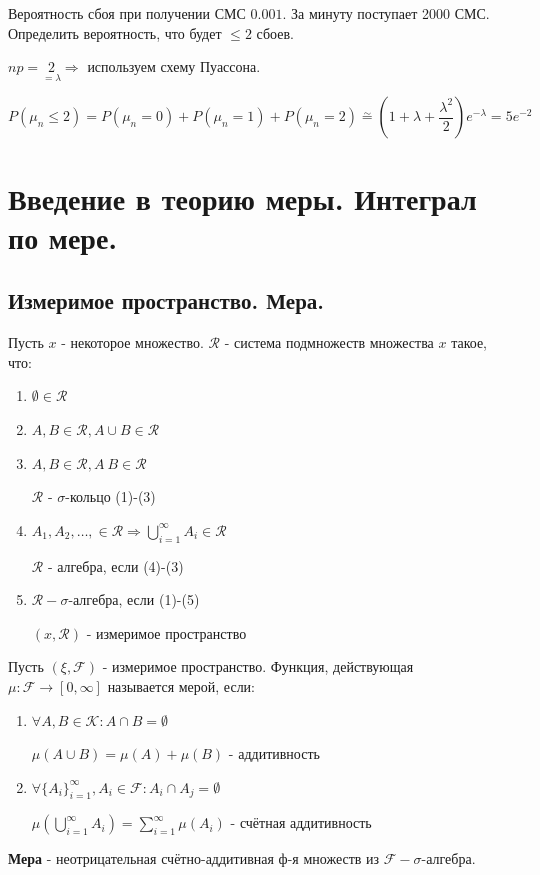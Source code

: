 \begin{exmp}
	Вероятность сбоя при получении СМС $0.001$. За минуту поступает 2000 СМС. Определить вероятность, что будет $\le2$ сбоев.
	
	$np = \underset{=\lambda}{2} \Rightarrow$ используем схему Пуассона.
	
	\[ P(\mu_n \le 2) = P(\mu_n = 0) + P(\mu_n = 1) + P(\mu_n = 2) \stackrel{\sim}{=} \left(1 + \lambda + \dfrac{\lambda^2}{2}\right) e^{- \lambda} = 5e^{-2} \]
\end{exmp}

\section{Введение в теорию меры. Интеграл по мере.}

\subsection{Измеримое пространство. Мера.}

\begin{definition}
	Пусть $x$ - некоторое множество. $\mathcal{R}$ - система подмножеств множества $x$ такое, что:
	\begin{enumerate}
		\item $\emptyset \in \mathcal{R}$
		\item $A,B \in \mathcal{R}, A \cup B \in \mathcal{R}$
		\item $A,B \in \mathcal{R}, A \ B \in \mathcal{R}$
		
		$\mathcal{R}$ - $\sigma$-кольцо (1)-(3)
		
		\item $A_1,A_2,\dots, \in \mathcal{R} \Rightarrow \bigcup_{i=1}^{\infty} A_i \in \mathcal{R}$
		
		$\mathcal{R}$ - алгебра, если (4)-(3)
		
		\item $\mathcal{R}-\sigma$-алгебра, если (1)-(5)
		
		$(x, \mathcal{R})$ - измеримое пространство
	\end{enumerate}
\end{definition}

\begin{definition}[Мера]
	Пусть $(\xi, \mathcal{F})$ - измеримое пространство. Функция, действующая $\mu: \mathcal{F} \to [0, \infty]$ называется мерой, если:
	\begin{enumerate}
		\item $\forall A, B \in \mathcal{K}: A \cap B = \emptyset$
		
		$\mu (A \cup B) = \mu(A) + \mu(B)$ - аддитивность
		\item $\forall \{ A_i \}_{i=1}^{\infty}, A_i \in \mathcal{F} : A_i \cap A_j = \emptyset $
		
		$\mu (\bigcup_{i=1}^{\infty} A_i) = \sum_{i=1}^{\infty} \mu (A_i)$ - счётная аддитивность
	\end{enumerate}
	\textbf{Мера} - неотрицательная счётно-аддитивная ф-я множеств из $\mathcal{F}-\sigma$-алгебра.
\end{definition}

